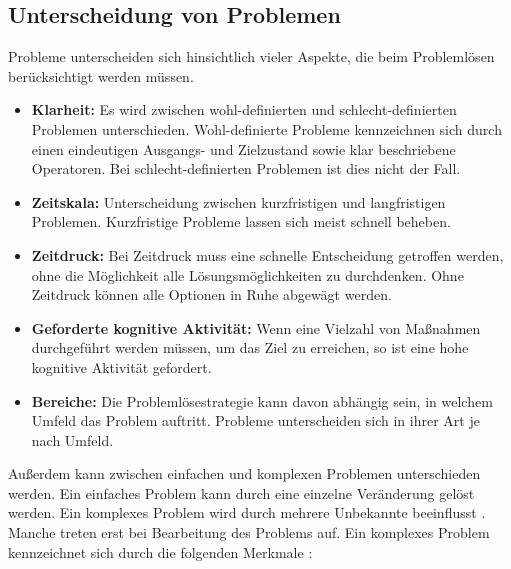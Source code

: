 \subsection{Unterscheidung von Problemen}
\label{2:Unterscheidung-Probleme}
Probleme unterscheiden sich hinsichtlich vieler Aspekte, die beim Problemlösen berücksichtigt werden müssen. \cite{Betsch2011}
\begin{itemize}
\item \textbf{Klarheit:} Es wird zwischen wohl-definierten und schlecht-definierten Problemen unterschieden. Wohl-definierte Probleme kennzeichnen sich durch einen eindeutigen Ausgangs- und Zielzustand sowie klar beschriebene Operatoren. Bei schlecht-definierten Problemen ist dies nicht der Fall.
\item \textbf{Zeitskala:} Unterscheidung zwischen kurzfristigen und langfristigen Problemen. Kurzfristige Probleme lassen sich meist schnell beheben.
\item \textbf{Zeitdruck:} Bei Zeitdruck muss eine schnelle Entscheidung getroffen werden, ohne die Möglichkeit alle Lösungsmöglichkeiten zu durchdenken. Ohne Zeitdruck können alle Optionen in Ruhe abgewägt werden.
\item \textbf{Geforderte kognitive Aktivität:} Wenn eine Vielzahl von Maßnahmen durchgeführt werden müssen, um das Ziel zu erreichen, so ist eine hohe kognitive Aktivität gefordert.
\item \textbf{Bereiche:} Die Problemlösestrategie kann davon abhängig sein, in welchem Umfeld das Problem auftritt. Probleme unterscheiden sich in ihrer Art je nach Umfeld.
\end{itemize}
Außerdem kann zwischen einfachen und komplexen Problemen unterschieden werden. Ein einfaches Problem kann durch eine einzelne Veränderung gelöst werden. Ein komplexes Problem wird durch mehrere Unbekannte beeinflusst \cite{Betsch2011}. Manche treten erst bei Bearbeitung des Problems auf. Ein komplexes Problem kennzeichnet sich durch die folgenden Merkmale \cite{Funke2015}: 
